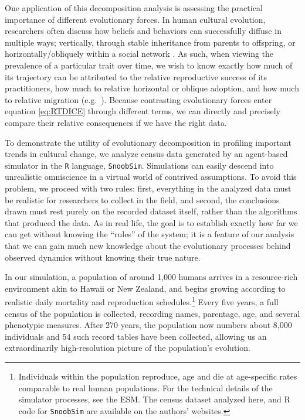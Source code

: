 \documentclass[11pt]{article}
\begin{document}
One application of this decomposition analysis is assessing the practical importance of different evolutionary forces. In human cultural evolution, researchers often discuss how beliefs and behaviors can successfully diffuse in multiple ways; vertically, through stable inheritance from parents to offspring, or horizontally/obliquely within a social network \citep{richerson2005not}.  As such, when viewing the prevalence of a particular trait over time, we wish to know exactly how much of its trajectory can be attributed to the relative reproductive success of its practitioners, how much to relative horizontal or oblique adoption, and how much to relative migration (e.g.~\citealp{stark1996rise, hout2001demographic}).  Because contrasting evolutionary forces enter equation \ref{eq:RTDICE} through different terms, we can directly and precisely compare their relative consequences if we have the right data.  

To demonstrate the utility of evolutionary decomposition in profiling important trends in cultural change, we analyze census data generated by an agent-based simulator in the \texttt{R} language, \texttt{SnoobSim}.  Simulations can easily descend into unrealistic omniscience in a virtual world of contrived assumptions.  To avoid this problem, we proceed with two rules: first, everything in the analyzed data must be realistic for researchers to collect in the field, and second, the conclusions drawn must rest purely on the recorded dataset itself, rather than the algorithms that produced the data.  As in real life, the goal is to establish exactly how far we can get without knowing the ``rules'' of the system; it is a feature of our analysis that we can gain much new knowledge about the evolutionary processes behind observed dynamics without knowing their true nature.  

In our simulation, a population of around 1,000 humans arrives in a resource-rich environment akin to Hawaii or New Zealand, and begins growing according to realistic daily mortality and reproduction schedules.\footnote{Individuals within the population reproduce, age and die at age-specific rates comparable to real human populations.  For the technical details of the simulator processes, see the ESM.  The census dataset analyzed here, and R code for \texttt{SnoobSim} are available on the authors' websites.}  Every five years, a full census of the population is collected, recording names, parentage, age, and several phenotypic measures.  After 270 years, the population now numbers about 8,000 individuals and 54 such record tables have been collected, allowing us an extraordinarily high-resolution picture of the population's evolution.
\end{document}
